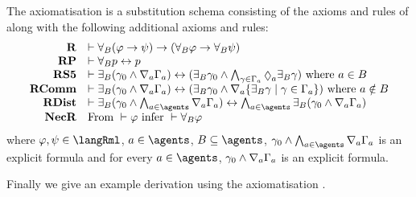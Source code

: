 \begin{definition}
    The axiomatisation \axiomRmlS{} is a substitution schema consisting of the axioms and rules of \axiomS{} along with the following additional axioms and rules:
$$
\begin{array}{rl}
    {\bf R} & \proves \allrefsBs (\phi \implies \psi) \implies (\allrefsBs \phi \implies \allrefsBs \psi)\\
    {\bf RP} & \proves \allrefsBs \atomP \iff \atomP\\
    {\bf RS5} & \proves \somerefsBs (\gamma_0 \land \coversA \Gamma_\agentA) \iff (\somerefsBs \gamma_0 \land \bigwedge_{\gamma \in \Gamma_\agentA} \possibleA \somerefsBs \gamma) \text{ where } \agentA \in \agentsB\\
    {\bf RComm} & \proves \somerefsBs (\gamma_0 \land \coversA \Gamma_\agentA) \iff (\somerefsBs \gamma_0 \land \coversA \{\somerefsBs \gamma \mid \gamma \in \Gamma_\agentA\}) \text{ where } \agentA \notin \agentsB\\
    {\bf RDist} & \proves \somerefsBs (\gamma_0 \land \bigwedge_{\agentA \in \agents} \coversA \Gamma_\agentA) \iff \bigwedge_{\agentA \in \agents} \somerefsBs (\gamma_0 \land \coversA \Gamma_\agentA)\\
    {\bf NecR} & \text{From } \proves \phi \text{ infer } \proves \allrefsBs \phi
\end{array}
$$
where $\phi, \psi \in \langRml$, $\agentA \in \agents$, $\agentsB \subseteq \agents$, $\gamma_0 \land \bigwedge_{\agentA \in \agents} \coversA \Gamma_\agentA$ is an explicit formula and for every $\agentA \in \agents$, $\gamma_0 \land \nabla_{a} \Gamma_a$ is an explicit formula.
\end{definition}

Finally we give an example derivation using the axiomatisation \axiomRmlS{}.

